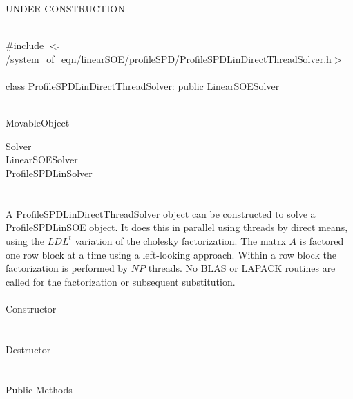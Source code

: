 
UNDER CONSTRUCTION

   \\
\indent \#include $<\tilde{
}$/system\_of\_eqn/linearSOE/profileSPD/ProfileSPDLinDirectThreadSolver.h$>$
\\ 

  \\
class ProfileSPDLinDirectThreadSolver: public LinearSOESolver  


 \\
MovableObject 

\indent\indent  Solver \\
\indent\indent\indent LinearSOESolver \\
\indent\indent\indent\indent ProfileSPDLinSolver \\
\indent\indent\indent\indent{} \\

  \\
\indent A ProfileSPDLinDirectThreadSolver object can be constructed to
solve a ProfileSPDLinSOE object. It does this in parallel using
threads by direct means, using the $LDL^t$ variation of the cholesky
factorization. The matrx $A$ is factored one row block at a time using
a left-looking approach. Within a row block the factorization is
performed by $NP$ threads. No BLAS or LAPACK routines are called 
for the factorization or subsequent substitution. \\

  \\
\indent\indent Constructor \\
\indent{}  \\ \\
\indent\indent Destructor \\
\indent{}\\  \\
\indent\indent Public Methods \\
\indent{} \\
\indent{} \\
\indent{} \\ 
\indent{} \\ 



